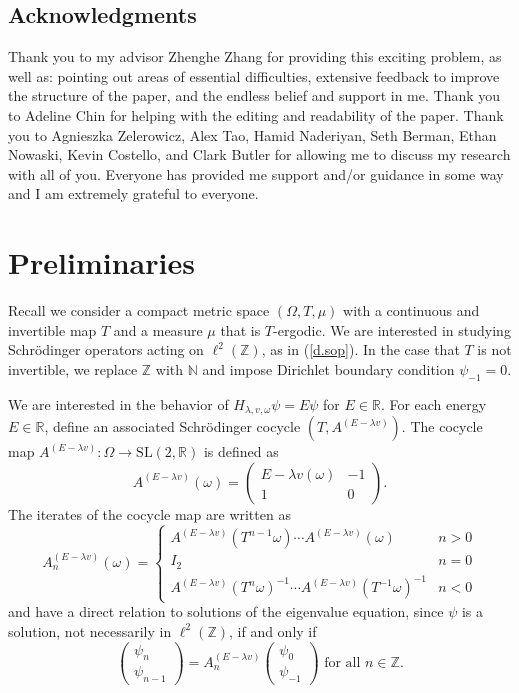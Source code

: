 \documentclass{amsart}
\newcommand{\NN}{\mathbb{N}}
\newcommand{\RR}{\mathbb{R}}
\newcommand{\ZZ}{\mathbb{Z}}
\begin{document}
\subsection*{Acknowledgments} Thank you to my advisor Zhenghe Zhang for providing this exciting problem, as well as: pointing out areas of essential difficulties, extensive feedback to improve the structure of the paper, and the endless belief and support in me. Thank you to Adeline Chin for helping with the editing and readability of the paper. Thank you to Agnieszka Zelerowicz, Alex Tao, Hamid Naderiyan, Seth Berman, Ethan Nowaski, Kevin Costello, and Clark Butler for allowing me to discuss my research with all of you. Everyone has provided me support and/or guidance in some way and I am extremely grateful to everyone. 

\section{Preliminaries}\hypertarget{secprelim}{}

Recall we consider a compact metric space $(\Omega, T, \mu)$ with a continuous and invertible map $T$ and a measure $\mu$ that is $T$-ergodic. We are interested in studying Schr\"odinger operators acting on $\ell^2(\ZZ)$, as in (\ref{d.sop}). In the case that $T$ is not invertible, we replace $\ZZ$ with $\NN$ and impose Dirichlet boundary condition $\psi_{-1} = 0$.

We are interested in the behavior of $H_{\lambda,v, \omega} \psi = E \psi$ for $E\in \RR$. For each energy $E\in \RR$, define an associated Schr\"odinger cocycle $(T,A^{(E-\lambda v)})$. The cocycle map $A^{(E-\lambda v)}: \Omega \rightarrow \mathrm{SL}(2,\RR)$ is defined as
\begin{equation}\label{d.sc}
    A^{(E-\lambda v)}(\omega) = \begin{pmatrix}
    E - \lambda v(\omega) & -1\\
    1 &0
\end{pmatrix}.
\end{equation}
The iterates of the cocycle map are written as
\[A^{(E-\lambda v)}_n(\omega) = \begin{cases}
    A^{(E-\lambda v)}(T^{n-1}\omega) \cdots A^{(E-\lambda v)}(\omega) & n > 0\\
    I_2 & n = 0\\
    A^{(E-\lambda v)}(T^{n}\omega)^{-1} \cdots A^{(E-\lambda v)}(T^{-1}\omega)^{-1} & n< 0
\end{cases}\]
and have a direct relation to solutions of the eigenvalue equation, since $\psi$ is a solution, not necessarily in $\ell^2(\ZZ)$, if and only if 
\[\begin{pmatrix}
    \psi_{n}\\
    \psi_{n-1}
\end{pmatrix} = A^{(E-\lambda v)}_n \begin{pmatrix}
    \psi_0\\
    \psi_{-1}
\end{pmatrix} \text{ for all } n\in \ZZ.\]
\end{document}

